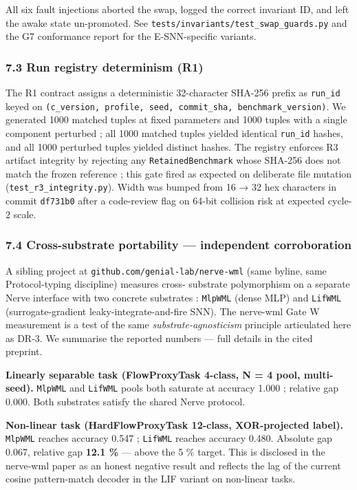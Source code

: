 \documentclass[
]{article}
\begin{document}
All six fault injections aborted the swap, logged the correct invariant
ID, and left the awake state un-promoted. See
\texttt{tests/invariants/test\_swap\_guards.py} and the G7 conformance
report for the E-SNN-specific variants.

\subsubsection{7.3 Run registry determinism
(R1)}\label{run-registry-determinism-r1}

The R1 contract assigns a deterministic 32-character SHA-256 prefix as
\texttt{run\_id} keyed on
\texttt{(c\_version,\ profile,\ seed,\ commit\_sha,\ benchmark\_version)}.
We generated 1000 matched tuples at fixed parameters and 1000 tuples
with a single component perturbed ; all 1000 matched tuples yielded
identical \texttt{run\_id} hashes, and all 1000 perturbed tuples yielded
distinct hashes. The registry enforces R3 artifact integrity by
rejecting any \texttt{RetainedBenchmark} whose SHA-256 does not match
the frozen reference ; this gate fired as expected on deliberate file
mutation (\texttt{test\_r3\_integrity.py}). Width was bumped from 16 →
32 hex characters in commit \texttt{df731b0} after a code-review flag on
64-bit collision risk at expected cycle-2 scale.

\subsubsection{7.4 Cross-substrate portability --- independent
corroboration}\label{cross-substrate-portability-independent-corroboration}

A sibling project at \texttt{github.com/genial-lab/nerve-wml} (same
byline, same Protocol-typing discipline) measures cross- substrate
polymorphism on a separate Nerve interface with two concrete substrates
: \texttt{MlpWML} (dense MLP) and \texttt{LifWML} (surrogate-gradient
leaky-integrate-and-fire SNN). The nerve-wml Gate W measurement is a
test of the same \emph{substrate-agnosticism} principle articulated here
as DR-3. We summarise the reported numbers --- full details in the cited
preprint.

\textbf{Linearly separable task (FlowProxyTask 4-class, N = 4 pool,
multi-seed).} \texttt{MlpWML} and \texttt{LifWML} pools both saturate at
accuracy 1.000 ; relative gap 0.000. Both substrates satisfy the shared
Nerve protocol.

\textbf{Non-linear task (HardFlowProxyTask 12-class, XOR-projected
label).} \texttt{MlpWML} reaches accuracy 0.547 ; \texttt{LifWML}
reaches accuracy 0.480. Absolute gap 0.067, relative gap \textbf{12.1
\%} --- above the 5 \% target. This is disclosed in the nerve-wml paper
as an honest negative result and reflects the lag of the current cosine
pattern-match decoder in the LIF variant on non-linear tasks.
\end{document}

